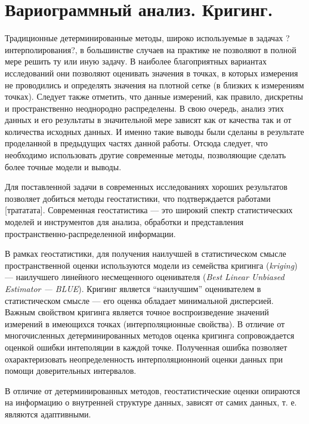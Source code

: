 
\section{Вариограммный анализ. Кригинг.} %
\label{sec:_variogram}

Традиционные детерминированные методы, широко используемые в задачах ?интерполирования?, в большинстве случаев на практике не позволяют в полной мере решить ту или иную задачу. В наиболее благоприятных вариантах исследований они позволяют оценивать значения в точках, в которых измерения не проводились и определять значения на плотной сетке (в близких к измерениям точках). Следует также отметить, что данные измерений, как правило, дискретны и пространственно неоднородно распределены. В свою очередь, анализ этих данных и его результаты в значительной мере зависят как от качества так и от количества исходных данных. И именно такие выводы были сделаны в результате проделанной в предыдущих частях данной работы. Отсюда следует, что необходимо использовать другие современные методы, позволяющие сделать более точные модели и выводы.

Для поставленной задачи в современных исследованиях хороших результатов позволяет добиться методы геостатистики, что подтверждается работами [трататата]. Современная геостатистика --- это широкий спектр статистических моделей и инструментов для анализа, обработки и представления пространственно-распределенной информации.

В рамках геостатистики, для получения наилучшей в статистическом смысле пространственной оценки используются модели из семейства кригинга (\textit{kriging}) --- наилучшего линейного несмещенного оценивателя (\textit{Best Linear Unbiased Estimator --- BLUE}). Кригинг является ``наилучшим'' оценивателем в статистическом смысле --- его оценка обладает минимальной дисперсией. Важным свойством кригинга является точное воспроизведение значений измерений в имеющихся точках (интерполяционные свойства). В отличие от многочисленных детерминированных методов оценка кригинга сопровождается оценкой ошибки интеполяции в каждой точке. Полученная ошибка позволяет охарактеризовать неопределенность интерполяционноий оценки данных при помощи доверительных интервалов.

В отличие от детерминированных методов, геостатистические оценки опираются на информацию о внутренней структуре данных, зависят от самих данных, т. е. являются адаптивными.


